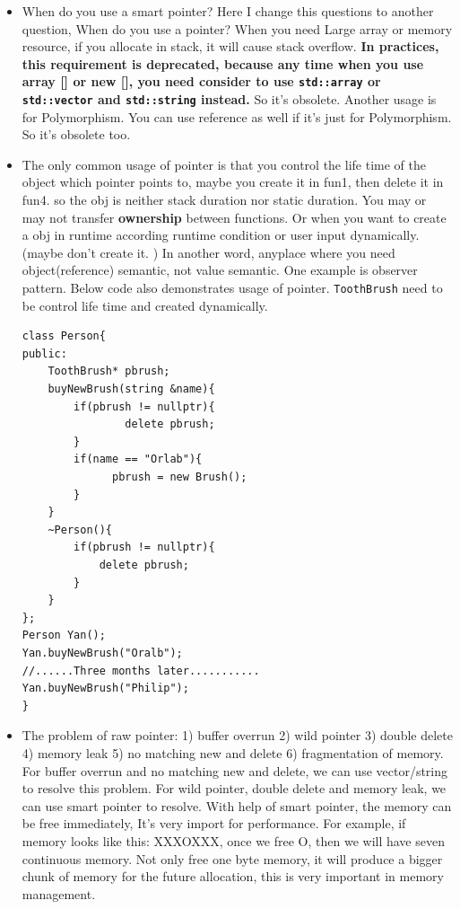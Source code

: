 \documentclass[a4paper,11pt,twoside]{book}
\begin{document}
\begin{itemize}

    \item When do you use a smart pointer? Here I change this questions to another question, When do you use a pointer? When you need Large array or memory resource,  if you allocate in stack, it will cause stack overflow. \textbf{In practices, this requirement is deprecated, because any time when you use array [] or new [], you need consider to use \texttt{std::array} or \texttt{std::vector} and \texttt{std::string} instead.} So it's obsolete. Another usage is for Polymorphism. You can use reference as well if it's just for Polymorphism. So it's obsolete too.


	\item The only common usage of pointer is that you control the life time of the object which pointer points to, maybe you create it in fun1, then delete it in fun4. so the obj is neither stack duration nor static duration. You may or may not transfer \textbf{ownership} between functions. Or when you want to create a obj in runtime according runtime condition or user input dynamically. (maybe don't create it. ) In another word, anyplace where you need object(reference) semantic, not value semantic. One example is observer pattern. Below code also demonstrates usage of pointer. \texttt{ToothBrush} need to be control life time and created dynamically.

\begin{lstlisting}[numbers=none]
class Person{
public:
	ToothBrush* pbrush;
	buyNewBrush(string &name){
	    if(pbrush != nullptr){
		    	delete pbrush;
	    }
	    if(name == "Orlab"){
	          pbrush = new Brush();
	    }
	}
	~Person(){
		if(pbrush != nullptr){
			delete pbrush;
	    }
    }
};
Person Yan();
Yan.buyNewBrush("Oralb");
//......Three months later...........
Yan.buyNewBrush("Philip");
}
\end{lstlisting}

	\item The problem of raw pointer: 1) buffer overrun 2) wild pointer 3) double delete 4) memory leak 5) no matching new and delete 6) fragmentation of memory. For buffer overrun and no matching new and delete, we can use vector/string to resolve this problem. For wild pointer, double delete and memory leak, we can use smart pointer to resolve. With help of smart pointer, the memory can be free immediately, It's very import for performance. For example, if memory looks like this: XXXOXXX, once we free O, then we will have seven continuous memory. Not only free one byte memory, it will produce a bigger chunk of memory for the future allocation, this is very important in memory management. 
	

\end{itemize}
\end{document}
